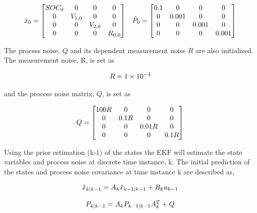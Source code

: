 \documentclass[12pt]{article}
\begin{document}
\begin{equation}
\centering
\begin{matrix}
\hat{x}_0 = 
	\begin{bmatrix}
	SOC_0 & 0 & 0 & 0 \\
	0 & V_{1,0} & 0 & 0 \\
	0 & 0 & V_{2,0} & 0 \\
	0 & 0 & 0 & R_{0,0} \\
	\end{bmatrix} & 

\hat{P}_0 = 
	\begin{bmatrix}
	0.1 & 0 & 0 & 0 \\
	0 & 0.001 & 0 & 0 \\
	0 & 0 & 0.001 & 0 \\
	0 & 0 & 0 & 0.001 \\
	\end{bmatrix} 

\end{matrix}
\end{equation}

The process noise, $Q$ and its dependent measurement noise $R$ are also initialized. The measurement noise, R, is set as 

\begin{equation}
\centering
R = 1 \times 10^{-4}
\end{equation}

and the process noise matrix, $Q$, is set as 

\begin{equation}
\centering
Q = 
	\begin{bmatrix}
	100R & 0 & 0 & 0 \\
	0 & 0.1R & 0 & 0 \\
	0 & 0 & 0.01R & 0 \\
	0 & 0 & 0 & 0.1R \\
	\end{bmatrix}
\end{equation}

Using the prior estimation (k-1) of the states the EKF will estimate the state variables and process noise at discrete time instance, k. The initial prediction of the states and process noise covariance at time instance k are described as,

\begin{equation}
\centering
\begin{matrix}

\hat{x}_{k|k-1} = A_k \hat{x}_{k-1|k-1} + B_k u_{k-1} \\ \\

P_{k|k-1} = A_k P_{k-1|k-1} A_k^T + Q

\end{matrix}
\end{equation}
\end{document}

